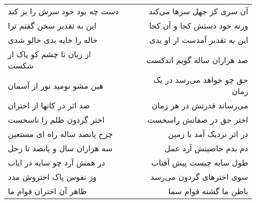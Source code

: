 \begin{center}
\begin{longtable}{l p{0.5cm} r}
\\
دست چه بود خود سرش را بر کند
&&
آن سری کز جهل سرها می‌کند
\\
این به تقدیر سخن گفتم ترا
&&
ورنه خود دستش کجا و آن کجا
\\
خاله را خایه بدی خالو شدی
&&
این به تقدیر آمدست ار او بدی
\\
از زبان تا چشم کو پاک از شکست
&&
صد هزاران ساله گویم اندکست
\\
هین مشو نومید نور از آسمان
&&
حق چو خواهد می‌رسد در یک زمان
\\
صد اثر در کانها از اختران
&&
می‌رساند قدرتش در هر زمان
\\
اختر گردون ظلم را ناسخست
&&
اختر حق در صفاتش راسخست
\\
چرخ پانصد ساله راه ای مستعین
&&
در اثر نزدیک آمد با زمین
\\
سه هزاران سال و پانصد تا زحل
&&
دم بدم خاصیتش آرد عمل
\\
در همش آرد چو سایه در ایاب
&&
طول سایه چیست پیش آفتاب
\\
وز نفوس پاک اختروش مدد
&&
سوی اخترهای گردون می‌رسد
\\
ظاهر آن اختران قوام ما
&&
باطن ما گشته قوام سما
\\
\end{longtable}
\end{center}
